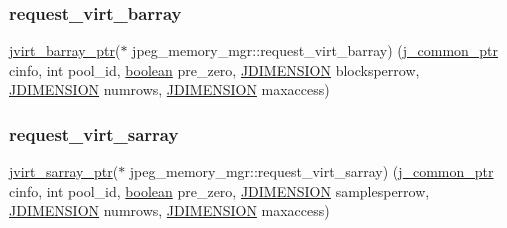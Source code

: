 \subsubsection{\texorpdfstring{request\+\_\+virt\+\_\+barray}{request\_virt\_barray}}
{\footnotesize\ttfamily \hyperlink{jpeglib_8h_a994f4cba141d82ded90af38e51223f0b}{jvirt\+\_\+barray\+\_\+ptr}($\ast$ jpeg\+\_\+memory\+\_\+mgr\+::request\+\_\+virt\+\_\+barray) (\hyperlink{jpeglib_8h_a1a177ab705cefea8f30ec31a48e62650}{j\+\_\+common\+\_\+ptr} cinfo, int pool\+\_\+id, \hyperlink{jconfig_8h_a7670a4e8a07d9ebb00411948b0bbf86d}{boolean} pre\+\_\+zero, \hyperlink{jmorecfg_8h_a04ed4674f6f1d0d50ec241531e38274f}{J\+D\+I\+M\+E\+N\+S\+I\+ON} blocksperrow, \hyperlink{jmorecfg_8h_a04ed4674f6f1d0d50ec241531e38274f}{J\+D\+I\+M\+E\+N\+S\+I\+ON} numrows, \hyperlink{jmorecfg_8h_a04ed4674f6f1d0d50ec241531e38274f}{J\+D\+I\+M\+E\+N\+S\+I\+ON} maxaccess)}

\mbox{\label{structjpeg__memory__mgr_ae468489cab71fc3b5da594afb639f777}} 
\subsubsection{\texorpdfstring{request\+\_\+virt\+\_\+sarray}{request\_virt\_sarray}}
{\footnotesize\ttfamily \hyperlink{jpeglib_8h_abc0b975077507c35b5a577e3ce9e4d91}{jvirt\+\_\+sarray\+\_\+ptr}($\ast$ jpeg\+\_\+memory\+\_\+mgr\+::request\+\_\+virt\+\_\+sarray) (\hyperlink{jpeglib_8h_a1a177ab705cefea8f30ec31a48e62650}{j\+\_\+common\+\_\+ptr} cinfo, int pool\+\_\+id, \hyperlink{jconfig_8h_a7670a4e8a07d9ebb00411948b0bbf86d}{boolean} pre\+\_\+zero, \hyperlink{jmorecfg_8h_a04ed4674f6f1d0d50ec241531e38274f}{J\+D\+I\+M\+E\+N\+S\+I\+ON} samplesperrow, \hyperlink{jmorecfg_8h_a04ed4674f6f1d0d50ec241531e38274f}{J\+D\+I\+M\+E\+N\+S\+I\+ON} numrows, \hyperlink{jmorecfg_8h_a04ed4674f6f1d0d50ec241531e38274f}{J\+D\+I\+M\+E\+N\+S\+I\+ON} maxaccess)}

\mbox{\label{structjpeg__memory__mgr_a495eef3a25dd3a34161a4e6f671cc6d7}} 
